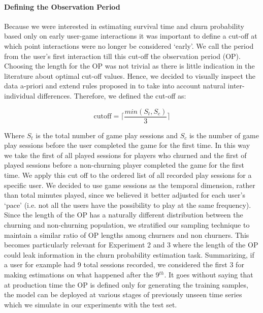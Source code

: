 \paragraph*{Defining the Observation Period}
Because we were interested in estimating survival time and churn probability based only on early user-game interactions it was important to define a cut-off at which point interactions were no longer be considered `early'. We call the period from the user's first interaction till this cut-off the observation period (OP). Choosing the length for the OP was not trivial as there is little indication in the literature about optimal cut-off values. Hence, we decided to visually inspect the data a-priori and extend rules proposed in \cite{drachen2016rapid, milovsevic2017early} to take into account natural inter-individual differences. Therefore, we defined the cut-off as:

\begin{equation}
\label{CutoffOP}
    \text{cutoff} = 
    \Biggl\lceil
        \dfrac
            {min(S_t, S_c)}
            {3}
    \Biggr\rceil
\end{equation}

Where $S_t$ is the total number of game play sessions and $S_c$ is the number of game play sessions before the user completed the game for the first time. In this way we take the first  of all played sessions for players who churned and the first  of played sessions before a non-churning player completed the game for the first time. We apply this cut off to the ordered list of all recorded play sessions for a specific user. We decided to use game sessions as the temporal dimension, rather than total minutes played, since we believed it better adjusted for each user's `pace' (i.e. not all the users have the possibility to play at the same frequency). Since the length of the OP has a naturally different distribution between the churning and non-churning population, we stratified our sampling technique to maintain a similar ratio of OP lengths among churners and non churners. This becomes particularly relevant for Experiment 2 and 3 where the length of the OP could leak information in the churn probability estimation task. Summarizing, if a user for example had 9 total sessions recorded, we considered the first 3 for making estimations on what happened after the 9$^{th}$. It goes without saying that at production time the OP is defined only for generating the training samples, the model can be deployed at various stages of previously unseen time series which we simulate in our experiments with the test set. 

